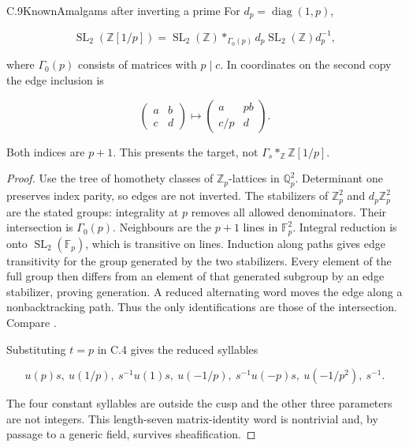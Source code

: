 \begin{statement}{C.9}{Known}{Amalgams after inverting a prime}
For $d_p=\operatorname{diag}(1,p)$,

$$
\operatorname{SL}_2(\mathbb Z[1/p])
 =\operatorname{SL}_2(\mathbb Z)*_{\Gamma_0(p)}
 d_p\operatorname{SL}_2(\mathbb Z)d_p^{-1},
$$

where $\Gamma_0(p)$ consists of matrices with $p\mid c$.
In coordinates on the second copy the edge inclusion is

$$
\begin{pmatrix}a&b\\c&d\end{pmatrix}
 \longmapsto\begin{pmatrix}a&pb\\c/p&d\end{pmatrix}.
$$

Both indices are $p+1$. This presents the target, not
$\Gamma_s*_{\mathbb Z}\mathbb Z[1/p]$.
\end{statement}
\begin{proof}
Use the tree of homothety classes of $\mathbb Z_p$-lattices
in $\mathbb Q_p^2$. Determinant one preserves index parity,
so edges are not inverted. The stabilizers of
$\mathbb Z_p^2$ and $d_p\mathbb Z_p^2$ are the stated
groups: integrality at $p$ removes all allowed denominators.
Their intersection is $\Gamma_0(p)$.
Neighbours are the $p+1$ lines in $\mathbb F_p^2$.
Integral reduction is onto $\operatorname{SL}_2(\mathbb F_p)$,
which is transitive on lines. Induction along paths gives
edge transitivity for the group generated by the two
stabilizers. Every element of the full group then differs
from an element of that generated subgroup by an edge
stabilizer, proving generation.
A reduced alternating word moves the edge along a
nonbacktracking path. Thus the only identifications are
those of the intersection. Compare
\citet[I.1.2, Theorem 1; II.1.4, Theorem 3 and Corollary 2]{C_Serre1980}.

Substituting $t=p$ in C.4 gives the reduced syllables

$$
u(p)s,\ u(1/p),\ s^{-1}u(1)s,\ u(-1/p),\
 s^{-1}u(-p)s,\ u(-1/p^2),\ s^{-1}.
$$

The four constant syllables are outside the cusp and the
other three parameters are not integers.
This length-seven matrix-identity word is nontrivial and,
by passage to a generic field, survives sheafification.
\end{proof}


